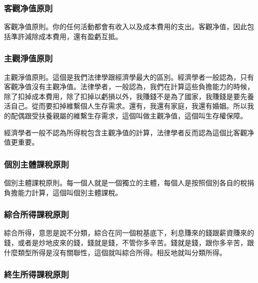 \documentclass[oneside,sub3section]{ctexbook}
\begin{document}
\hypertarget{ux5ba2ux89c0ux51c0ux503cux539fux5247}{%
\subsubsection{客觀净值原則}\label{ux5ba2ux89c0ux51c0ux503cux539fux5247}}

客觀净值原則。你的任何活動都會有收入以及成本費用的支出。客觀净值，因此包括準許減除成本費用，還有盈虧互抵。

\hypertarget{ux4e3bux89c0ux6de8ux503cux539fux5247}{%
\subsubsection{主觀淨值原則}\label{ux4e3bux89c0ux6de8ux503cux539fux5247}}

主觀淨值原則。這個是我們法律學跟經濟學最大的區別。經濟學者一般認為，只有客觀净值沒有主觀净值。法律學者，一般認為，我們在計算這些負擔能力的時候，除了扣掉成本費用，除了扣掉以虧損以外，我賺錢不是為了國家，我賺錢是要先養活自己。從而要扣掉維繫個人生存需求。還有，我還有家庭，我還有婚姻。所以我的配偶跟受扶養親屬的維繫生存需求，這個叫做主觀净值，這個叫生存權保障。

經濟學者一般不認為所得稅包含主觀净值的計算，法律學者反而認為這個比客觀净值更重要。

\hypertarget{ux500bux5225ux4e3bux9ad4ux8ab2ux7a05ux539fux5247}{%
\subsubsection{個別主體課稅原則}\label{ux500bux5225ux4e3bux9ad4ux8ab2ux7a05ux539fux5247}}

個別主體課稅原則。每一個人就是一個獨立的主體，每個人是按照個別各自的稅捐負擔能力計算，這個叫個別主體課稅。

\hypertarget{ux7d9cux5408ux6240ux5f97ux8ab2ux7a05ux539fux5247}{%
\subsubsection{綜合所得課稅原則}\label{ux7d9cux5408ux6240ux5f97ux8ab2ux7a05ux539fux5247}}

綜合所得，意思是說不分類，綜合在同一個稅基底下，利息賺來的錢跟薪資賺來的錢，或者是炒地皮來的錢，錢就是錢，不管你多辛苦。錢就是錢，跟你多辛苦，跟什麼類型所得是沒有關聯性，這個就叫綜合所得。相反地就叫分類所得。

\hypertarget{ux7d42ux751fux6240ux5f97ux8ab2ux7a05ux539fux5247}{%
\subsubsection{終生所得課稅原則}\label{ux7d42ux751fux6240ux5f97ux8ab2ux7a05ux539fux5247}}
\end{document}
